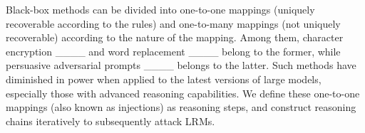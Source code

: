 Black-box methods can be divided into one-to-one mappings (uniquely recoverable according to the rules) and one-to-many mappings (not uniquely recoverable) according to the nature of the mapping. Among them, character encryption ____ and word replacement ____ belong to the former, while persuasive adversarial prompts ____ belongs to the latter. Such methods have diminished in power when applied to the latest versions of large models, especially those with advanced reasoning capabilities. We define these one-to-one mappings (also known as injections) as reasoning steps, and construct reasoning chains iteratively to subsequently attack LRMs.